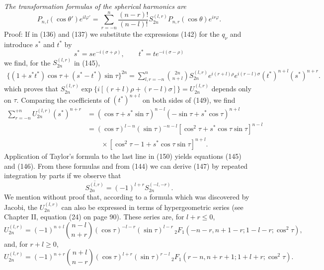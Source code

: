 \emph{The transformation formulas of the spherical harmonics are}
\begin{equation}\tag{148}
P_{n,l}(\cos\theta')e^{il\varphi'}
=\sum_{r=-n}^{n}\frac{(n-r)!}{(n-l)!}S_{2n}^{(l,r)}
P_{n,r}(\cos\theta)e^{ir\varphi}.
\end{equation}
Proof: If in (136) and (137) we substitute the expressions (142) for the $q_\nu$ and introduce $s^*$ and $t^*$ by
\[
s^*=se^{-i(\sigma+\rho)},\qquad t^*=te^{-i(\sigma-\rho)}
\]
we find, for the $S_{2n}^{(l,r)}$ in (145),
\begin{equation}\tag{149}
\begin{aligned}
\{(1+s^*t^*)\cos\tau+(s^*-t^*)\sin\tau\}^{2n}
=\sum_{l,r=-n}^{n}\binom{2n}{n+l}S_{2n}^{(l,r)}
 e^{i(r+l)\rho}e^{i(r-l)\sigma}(t^*)^{n+l}(s^*)^{n+r}.
\end{aligned}
\end{equation}
which proves that $S_{2n}^{(l,r)}\exp\{i[(r+l)\rho+(r-l)\sigma]\}=U_{2n}^{(l,r)}$ depends only on $\tau$. Comparing the coefficients of $(t^*)^{n+l}$ on both sides of (149), we find
\begin{equation}\tag{150}
\begin{aligned}
\sum_{r=-n}^{+n}U_{2n}^{(l,r)}(s^*)^{n+r}
&=(\cos\tau+s^*\sin\tau)^{n-l}(-\sin\tau+s^*\cos\tau)^{n+l}\\
&=(\cos\tau)^{l-n}(\sin\tau)^{-n-l}
[\cos^2\tau+s^*\cos\tau\sin\tau]^{n-l}\\
&\qquad\times[\cos^2\tau-1+s^*\cos\tau\sin\tau]^{n+l}.
\end{aligned}
\end{equation}
Application of Taylor's formula to the last line in (150) yields equations (145) and (146). From these formulas and from (144) we can derive (147) by repeated integration by parts if we observe that
\[
\overline{S_{2n}^{(l,r)}}=(-1)^{l+r}S_{2n}^{(-l,-r)}.
\]
We mention without proof that, according to a formula which was discovered by Jacobi, the $U_{2n}^{(l,r)}$ can also be expressed in terms of hypergeometric series (see Chapter II, equation (24) on page 90). These series are, for $l+r\le0$,
\[
U_{2n}^{(l,r)}=(-1)^{n+l}\binom{n-l}{n+r}
(\cos\tau)^{-l-r}(\sin\tau)^{l-r}
\,{}_2F_1(-n-r,n+1-r;1-l-r;\cos^2\tau),
\]
and, for $r+l\ge0$,
\[
U_{2n}^{(l,r)}=(-1)^{n+r}\binom{n+l}{n-r}
(\cos\tau)^{l+r}(\sin\tau)^{r-l}
\,{}_2F_1(r-n,n+r+1;1+l+r;\cos^2\tau).
\]
